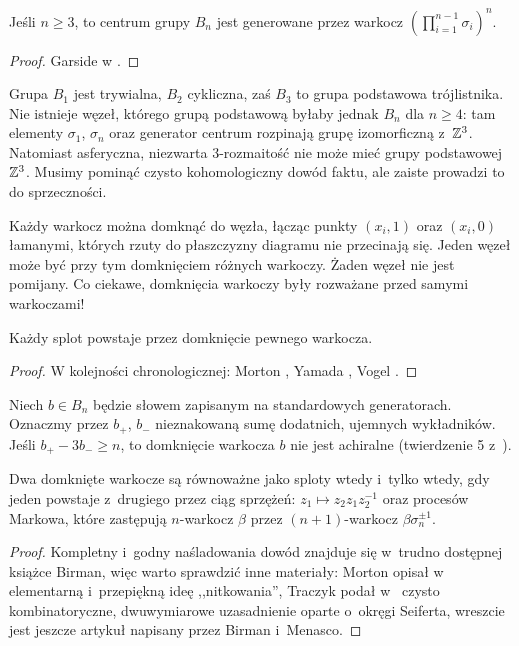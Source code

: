 \begin{proposition}
    Jeśli $n \ge 3$, to centrum grupy $B_n$ jest generowane przez warkocz $(\prod_{i = 1}^{n-1} \sigma_i)^n$.
\end{proposition}

\begin{proof}
    Garside w \cite{garside69}.
\end{proof}

Grupa $B_1$ jest trywialna, $B_2$ cykliczna, zaś $B_3$ to grupa podstawowa trójlistnika.
Nie istnieje węzeł, którego grupą podstawową byłaby jednak $B_n$ dla $n \ge 4$: tam elementy $\sigma_1$, $\sigma_n$ oraz generator centrum rozpinają grupę izomorficzną z~$\mathbb Z^3$.
Natomiast asferyczna, niezwarta 3-rozmaitość nie może mieć grupy podstawowej $\mathbb Z^3$.
Musimy pominąć czysto kohomologiczny dowód faktu, ale zaiste prowadzi to do sprzeczności.

Każdy warkocz można domknąć do węzła, łącząc punkty $(x_i, 1)$ oraz $(x_i, 0)$
łamanymi, których rzuty do płaszczyzny diagramu nie przecinają się.
Jeden węzeł może być przy tym domknięciem różnych warkoczy.
Żaden węzeł nie jest pomijany.
Co ciekawe, domknięcia warkoczy były rozważane przed samymi warkoczami!

\begin{theorem}[Alexander, 1923] \label{alex_thm}
     Każdy splot powstaje przez domknięcie pewnego warkocza.
\end{theorem}

\begin{proof}
    W kolejności chronologicznej: Morton \cite{mortonhr86}, Yamada \cite{yamada87}, Vogel \cite{vogel90}.
\end{proof}

Niech $b \in B_n$ będzie słowem zapisanym na standardowych generatorach.
Oznaczmy przez $b_+$, $b_-$ nieznakowaną sumę dodatnich, ujemnych wykładników.
Jeśli $b_+ - 3b_- \ge n$, to domknięcie warkocza $b$ nie jest achiralne (twierdzenie 5 z~\cite{jones85}).

\begin{theorem}[Markow, 1936]
    Dwa domknięte warkocze są równoważne jako sploty wtedy i~tylko wtedy,
    gdy jeden powstaje z~drugiego przez ciąg
    sprzężeń: $z_1 \mapsto z_2 z_1 z_2^{-1}$ oraz procesów Markowa,
    które zastępują $n$-warkocz $\beta$ przez $(n+1)$-warkocz $\beta\sigma_n^{\pm 1}$.
\end{theorem}

\begin{proof}
    Kompletny i~godny naśladowania dowód znajduje się w~trudno dostępnej książce \cite{birman74} Birman, więc warto sprawdzić inne materiały:
    Morton opisał w~\cite{mortonhr86} elementarną i~przepiękną ideę ,,nitkowania'',
    Traczyk podał w~\cite{traczyk98} czysto kombinatoryczne, dwuwymiarowe uzasadnienie oparte o~okręgi Seiferta,
    wreszcie jest jeszcze artykuł \cite{birman02} napisany przez Birman i~Menasco.
\end{proof}

